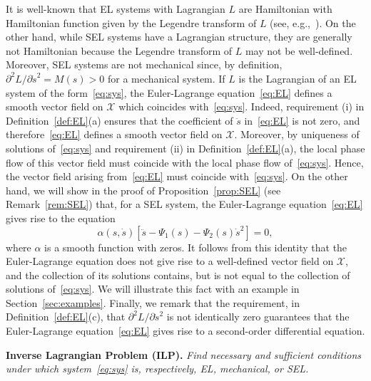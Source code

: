 \begin{remark}\label{rem:EL}
	It is well-known that EL systems with Lagrangian $L$ are Hamiltonian
	with Hamiltonian function given by the Legendre transform of $L$ (see,
	e.g.,~\cite{ArnoldClassicalMech}).  On the other hand, while SEL
	systems have a Lagrangian structure, they are generally not
	Hamiltonian because the Legendre transform of $L$ may not be
	well-defined. Moreover, SEL systems are not mechanical since, by
	definition, $\partial^2 L / \partial \dot s^2 = M(s) >0$ for a
	mechanical system.  If $L$ is the Lagrangian of an EL system of the
	form~\eqref{eq:sys}, the Euler-Lagrange equation~\eqref{eq:EL} defines
	a smooth vector field on $\mathcal{X}$ which coincides with~\eqref{eq:sys}.
	Indeed, requirement (i) in Definition~\ref{def:EL}(a) ensures that the
	coefficient of $\ddot s$ in~\eqref{eq:EL} is not zero, and
	therefore~\eqref{eq:EL} defines a smooth vector field on $\mathcal{X}$.
	Moreover, by uniqueness of solutions of~\eqref{eq:sys} and requirement
	(ii) in Definition~\ref{def:EL}(a), the local phase flow of this
	vector field must coincide with the local phase flow
	of~\eqref{eq:sys}. Hence, the vector field arising from~\eqref{eq:EL}
	must coincide with~\eqref{eq:sys}.  On the other hand, we will show in
	the proof of Proposition~\ref{prop:SEL} (see Remark~\ref{rem:SEL})
	that, for a SEL system, the Euler-Lagrange equation~\eqref{eq:EL}
	gives rise to the equation
				\[
	\alpha(s,\dot s) \left[\ddot  s - \Psi_1(s) - \Psi_2(s)\dot s^2\right]=0,
	\]
				where $\alpha$ is a smooth function with zeros. It follows from this
	identity that the Euler-Lagrange equation does not give rise to a
	well-defined vector field on $\mathcal{X}$, and the collection of its
	solutions contains, but is not equal to the
	collection of solutions of~\eqref{eq:sys}. We will illustrate this
	fact with an example in Section~\ref{sec:examples}.  Finally, we
	remark that the requirement, in Definition~\ref{def:EL}(c), that
	$\partial^2 L / \partial \dot s^2$ is not identically zero guarantees
	that the Euler-Lagrange equation~\eqref{eq:EL} gives rise to a
	second-order differential equation.
\end{remark}

{\sc \bf Inverse Lagrangian Problem (ILP).}  {\em Find necessary and
	sufficient conditions under which system~\eqref{eq:sys} is,
	respectively, EL, mechanical, or SEL.}

